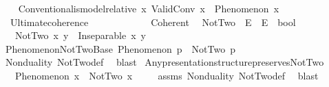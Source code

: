 \begin{isabellebody}
\isanewline
{}\isamarkupfalse%
\ \isanewline
\ \ Conventional{\isacharunderscore}{\kern0pt}is{\isacharunderscore}{\kern0pt}model{\isacharunderscore}{\kern0pt}relative{\isacharcolon}{\kern0pt}\ {\isachardoublequoteopen}{\isasymforall}x{\isachardot}{\kern0pt}\ ValidConv\ x\ {\isasymlongrightarrow}\ Phenomenon\ x{\isachardoublequoteclose}\ \isanewline
\ \ Ultimate{\isacharunderscore}{\kern0pt}coherence{\isacharcolon}{\kern0pt}\ \ \ \ \ \ \ \ \ \ \ \ \ {\isachardoublequoteopen}Coherent\ {\isasymOmega}{\isachardoublequoteclose}%
\isadelimdocument
%
\endisadelimdocument
%
\isatagdocument
%
\isamarkuptrue%
%
\endisatagdocument
{\isafolddocument}%
%
\isadelimdocument
%
\endisadelimdocument
{}\isamarkupfalse%
\ NotTwo\ {\isacharcolon}{\kern0pt}{\isacharcolon}{\kern0pt}\ {\isachardoublequoteopen}E\ {\isasymRightarrow}\ E\ {\isasymRightarrow}\ bool{\isachardoublequoteclose}\isanewline
\ \ \ {\isachardoublequoteopen}NotTwo\ x\ y\ {\isasymlongleftrightarrow}\ Inseparable\ x\ y{\isachardoublequoteclose}\isanewline
\isanewline
{}\isamarkupfalse%
\ Phenomenon{\isacharunderscore}{\kern0pt}NotTwo{\isacharunderscore}{\kern0pt}Base{\isacharcolon}{\kern0pt}\ {\isachardoublequoteopen}Phenomenon\ p\ {\isasymLongrightarrow}\ NotTwo\ p\ {\isasymOmega}{\isachardoublequoteclose}\isanewline
%
\isadelimproof
\ \ %
\endisadelimproof
%
\isatagproof
{}\isamarkupfalse%
\ Nonduality\ NotTwo{\isacharunderscore}{\kern0pt}def\ \isamarkupfalse%
\ blast%
\endisatagproof
{\isafoldproof}%
%
\isadelimproof
\isanewline
%
\endisadelimproof
\isanewline
{}\isamarkupfalse%
\ Any{\isacharunderscore}{\kern0pt}presentation{\isacharunderscore}{\kern0pt}structure{\isacharunderscore}{\kern0pt}preserves{\isacharunderscore}{\kern0pt}NotTwo{\isacharcolon}{\kern0pt}\isanewline
\ \ \ {\isachardoublequoteopen}Phenomenon\ x{\isachardoublequoteclose}\ \ {\isachardoublequoteopen}NotTwo\ x\ {\isasymOmega}{\isachardoublequoteclose}\isanewline
%
\isadelimproof
\ \ %
\endisadelimproof
%
\isatagproof
{}\isamarkupfalse%
\ assms\ Nonduality\ NotTwo{\isacharunderscore}{\kern0pt}def\ \isamarkupfalse%
\ blast%
\endisatagproof
{\isafoldproof}%
%
\isadelimproof
\isanewline
%
\endisadelimproof
%
\isadelimtheory
\isanewline
%
\endisadelimtheory
%
\isatagtheory
{}\isamarkupfalse%
%
\endisatagtheory
{\isafoldtheory}%
%
\isadelimtheory
%
\endisadelimtheory
%
\end{isabellebody}%
